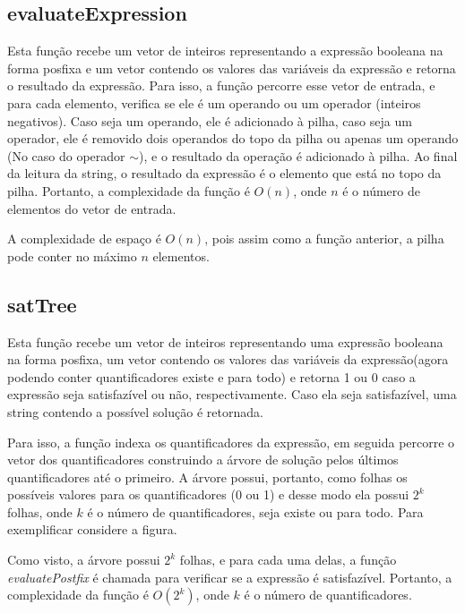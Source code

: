 \documentclass{article}
\begin{document}
\subsection{evaluateExpression}
Esta função recebe um vetor de inteiros representando a expressão booleana na forma posfixa e um vetor contendo os valores das variáveis da expressão e retorna o resultado da expressão. Para isso, a função percorre esse vetor de entrada, e para cada elemento, verifica se ele é um operando ou um operador (inteiros negativos). Caso seja um operando, ele é adicionado à pilha, caso seja um operador, ele é removido dois operandos do topo da pilha ou apenas um operando (No caso do operador $\sim$), e o resultado da operação é adicionado à pilha. Ao final da leitura da string, o resultado da expressão é o elemento que está no topo da pilha. Portanto, a complexidade da função é $O(n)$, onde $n$ é o número de elementos do vetor de entrada.

A complexidade de espaço é $O(n)$, pois assim como a função anterior, a pilha pode conter no máximo $n$ elementos.

\subsection{satTree}
Esta função recebe um vetor de inteiros representando uma expressão booleana na forma posfixa, um vetor contendo os valores das variáveis da expressão(agora podendo conter quantificadores existe e para todo) e retorna 1 ou 0 caso a expressão seja satisfazível ou não, respectivamente. Caso ela seja satisfazível, uma string contendo a possível solução é retornada. 

Para isso, a função indexa os quantificadores da expressão, em seguida percorre o vetor dos quantificadores construindo a árvore de solução pelos últimos quantificadores até o primeiro.
A árvore possui, portanto, como folhas os possíveis valores para os quantificadores (0 ou 1) e desse modo ela possui $2^k$ folhas, onde $k$ é o número de quantificadores, seja existe ou para todo. Para exemplificar considere a figura.


Como visto, a árvore possui $2^k$ folhas, e para cada uma delas, a função \textit{evaluatePostfix} é chamada para verificar se a expressão é satisfazível. Portanto, a complexidade da função é $O(2^k)$, onde $k$ é o número de quantificadores.
\end{document}
